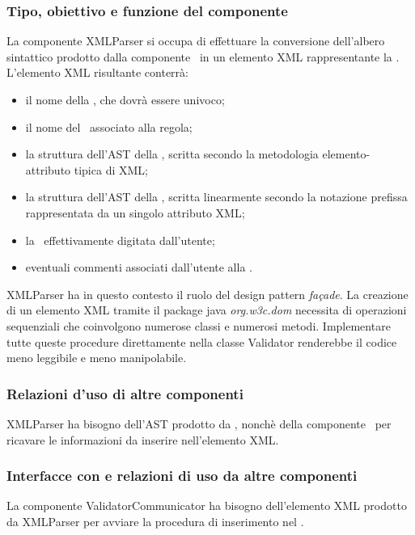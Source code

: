 \subsubsection{Tipo, obiettivo e funzione del componente}
La componente XMLParser si occupa di effettuare la conversione dell'albero sintattico prodotto dalla componente \brp\ in un elemento XML rappresentante la \br. L'elemento XML risultante conterr\`a:
\begin{itemize}
 \item il nome della \br, che dovr\`a essere univoco;
 \item il nome del \bo\ associato alla regola;
 \item la struttura dell'AST della \br, scritta secondo la metodologia elemento-attributo tipica di XML;
 \item la struttura dell'AST della \br, scritta linearmente secondo la notazione prefissa rappresentata da un singolo attributo XML;
 \item la \br\ effettivamente digitata dall'utente;
 \item eventuali commenti associati dall'utente alla \br.
\end{itemize}
XMLParser ha in questo contesto il ruolo del design pattern \textit{fa\c{c}ade}. La creazione di un elemento XML tramite il package java \textit{org.w3c.dom} necessita di operazioni sequenziali che coinvolgono numerose classi e numerosi metodi. Implementare tutte queste procedure direttamente nella classe Validator renderebbe il codice meno leggibile e meno manipolabile.
\subsubsection{Relazioni d'uso di altre componenti}
XMLParser ha bisogno dell'AST prodotto da \brp, nonch\`e della componente \br\ per ricavare le informazioni da inserire nell'elemento XML.
\subsubsection{Interfacce con e relazioni di uso da altre componenti}
La componente ValidatorCommunicator ha bisogno dell'elemento XML prodotto da XMLParser per avviare la procedura di inserimento nel \rp.
